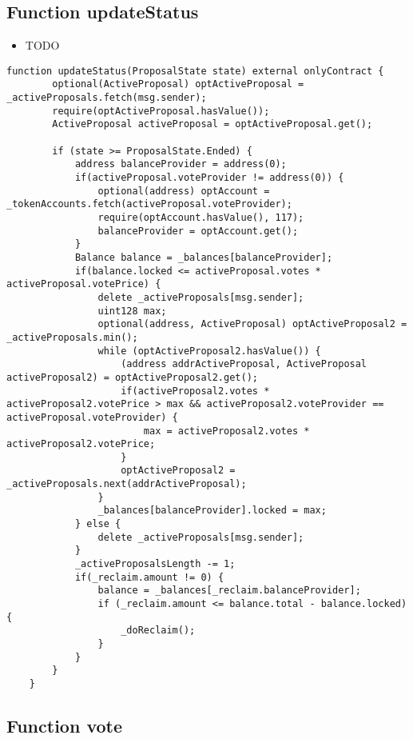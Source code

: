 \subsection{Function updateStatus}

\begin{itemize}
\item TODO
\end{itemize}

\begin{lstlisting}[firstnumber=149]
    function updateStatus(ProposalState state) external onlyContract {
        optional(ActiveProposal) optActiveProposal = _activeProposals.fetch(msg.sender);
        require(optActiveProposal.hasValue());
        ActiveProposal activeProposal = optActiveProposal.get();

        if (state >= ProposalState.Ended) {
            address balanceProvider = address(0);
            if(activeProposal.voteProvider != address(0)) {
                optional(address) optAccount = _tokenAccounts.fetch(activeProposal.voteProvider);
                require(optAccount.hasValue(), 117);
                balanceProvider = optAccount.get();
            }
            Balance balance = _balances[balanceProvider];
            if(balance.locked <= activeProposal.votes * activeProposal.votePrice) {
                delete _activeProposals[msg.sender];
                uint128 max;
                optional(address, ActiveProposal) optActiveProposal2 = _activeProposals.min();
                while (optActiveProposal2.hasValue()) {
                    (address addrActiveProposal, ActiveProposal activeProposal2) = optActiveProposal2.get();
                    if(activeProposal2.votes * activeProposal2.votePrice > max && activeProposal2.voteProvider == activeProposal.voteProvider) {
                        max = activeProposal2.votes * activeProposal2.votePrice;
                    }
                    optActiveProposal2 = _activeProposals.next(addrActiveProposal);
                }
                _balances[balanceProvider].locked = max;
            } else {
                delete _activeProposals[msg.sender];
            }
            _activeProposalsLength -= 1;
            if(_reclaim.amount != 0) {
                balance = _balances[_reclaim.balanceProvider];
                if (_reclaim.amount <= balance.total - balance.locked) {
                    _doReclaim();
                }
            }
        }
    }
\end{lstlisting}

\subsection{Function vote}

